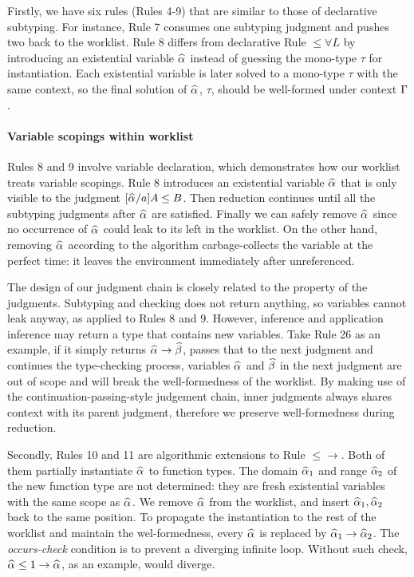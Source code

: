 Firstly, we have six rules (Rules 4-9) that are similar to those of declarative subtyping.
For instance, Rule 7 consumes one subtyping judgment and pushes two back to the worklist.
Rule 8 differs from declarative Rule ${\le}{\forall}L$ by introducing an existential variable $\al$ instead of guessing the mono-type $\tau$ for instantiation.
Each existential variable is later solved to a mono-type $\tau$ with the same context,
so the final solution of $\al$, $\tau$, should be well-formed under context $\Gamma$.

\paragraph{Variable scopings within worklist}
Rules 8 and 9 involve variable declaration, which demonstrates how our worklist treats variable scopings.
Rule 8 introduces an existential variable $\al$ that is only visible to the judgment $[\al/a]A \le B$.
Then reduction continues until all the subtyping judgments after $\al$ are satisfied.
Finally we can safely remove $\al$ since no occurrence of $\al$ could leak to its left in the worklist.
On the other hand, removing $\al$ according to the algorithm carbage-collects the variable at the perfect time: it leaves the environment immediately after unreferenced.

The design of our judgment chain is closely related to the property of the judgments.
Subtyping and checking does not return anything, so variables cannot leak anyway, as applied to Rules 8 and 9.
However, inference and application inference may return a type that contains new variables.
Take Rule 26 as an example, if it simply returns $\al \to \bt$, passes that to the next judgment and continues the type-checking process,
variables $\al$ and $\bt$ in the next judgment are out of scope
and will break the well-formedness of the worklist.
By making use of the continuation-passing-style judgement chain,
inner judgments always shares context with its parent judgment,
therefore we preserve well-formedness during reduction.

Secondly, Rules 10 and 11 are algorithmic extensions to Rule $\mathtt{{\le}{\to}}$.
Both of them partially instantiate $\al$ to function types.
The domain $\al[1]$ and range $\al[2]$ of the new function type are not determined:
they are fresh existential variables with the same scope as $\al$.
We remove $\al$ from the worklist, and insert $\al[1], \al[2]$ back to the same position.
To propagate the instantiation to the rest of the worklist and maintain the wel-formedness,
every $\al$ is replaced by $\al[1] \to \al[2]$.
The \emph{occurs-check} condition is to prevent a diverging infinite loop.
Without such check, $\al \le 1 \to \al$, as an example, would diverge.

